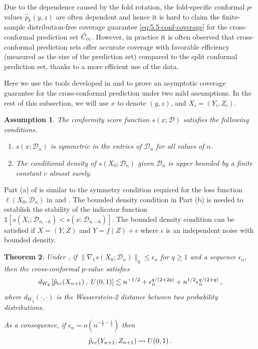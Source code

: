 \documentclass[11pt]{article}
\theoremstyle{plain}
\newtheorem{theorem}{Theorem}[section]
\newtheorem{assumption}[theorem]{Assumption}
\newcommand{\D}{{\mathcal{D}}}
\begin{document}
Due to the dependence caused by the fold rotation, the fold-specific conformal $p$-values $\hat p_k(y,z)$ are often dependent and hence it is hard to claim the finite-sample distribution-free coverage guarantee \eqref{eq:5.5-conf-coverage} for the cross-conformal prediction set $\hat C_{\rm cc}$.  However, in practice it is often observed that cross-conformal prediction sets offer accurate coverage with favorable efficiency (measured as the size of the prediction set) compared to the split conformal prediction set, thanks to a more efficient use of the data.

Here we use the tools developed in  and  to prove an asymptotic coverage guarantee for the cross-conformal prediction under two mild assumptions.  In the rest of this subsection, we will use $x$ to denote $(y,z)$, and $X_i=(Y_i,Z_i)$.
\begin{assumption}
    \label{asm:5.5-conf-score-stab}
    The conformity score function $s(x;\D)$ satisfies the following conditions.
    \begin{enumerate}
        \item [(a)] $s(x;\D_n)$ is symmetric in the entries of $\D_n$ for all values of $n$.
        \item [(b)]  The conditional density of $s(X_0;\D_n)$ given $\D_n$ is upper bounded by a finite constant $c$ almost surely.
    \end{enumerate} 
\end{assumption}

Part (a) of  is similar to the symmetry condition required for the loss function $\ell(X_0,\D_n)$ in  and .  The bounded density condition in Part (b) is needed to establish the stability of the indicator function $\mathds{1}[s(X_i;\D_{n,-k})<s(x;\D_{n,-k})]$.  The bounded density condition can be satisfied if $X=(Y,Z)$ and $Y=f(Z)+\epsilon$ where $\epsilon$ is an independent noise with bounded density.

\begin{theorem}
    \label{thm:5.5-cross-conf}
    Under , if
       $\|\nabla_1 s(X_0;\D_n)\|_q\le \epsilon_n$ for $q\ge 1$ and a sequence $\epsilon_n$, then
    the cross-conformal $p$-value satisfies
    $$
    d_{W_2}\left[\hat p_{\rm cc}(X_{n+1})\,,~U(0,1)\right]\lesssim n^{-1/2}+\epsilon_n^{q/(2+2q)}+n^{1/2}\epsilon_n^{q/(2+q)}\,,
    $$
    where $d_{W_2}(\cdot,\cdot)$ is the Wasserstein-2 distance between two probability distributions.

    As a consequence, if
$\epsilon_n=o(n^{-\frac{1}{2}-\frac{1}{q}})$ then
$$\hat p_{\rm cc}(Y_{n+1},Z_{n+1})\rightsquigarrow U(0,1)\,.$$ 
\end{theorem}
\end{document}
